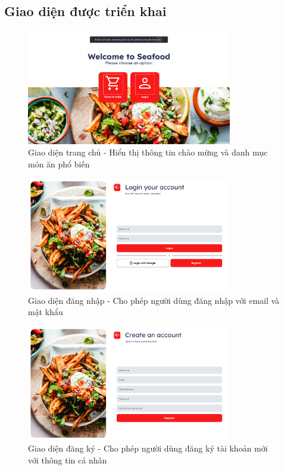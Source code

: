 \documentclass[a4paper]{article}
\begin{document}
\subsection{Giao diện được triển khai}
    \begin{figure}[H]
        \centering
        \includegraphics[width=0.8\textwidth]{home.png}
        \caption{Giao diện trang chủ - Hiển thị thông tin chào mừng và danh mục món ăn phổ biến}
    \end{figure}
    
    \begin{figure}[H]
        \centering
        \includegraphics[width=0.8\textwidth]{login.png}
        \caption{Giao diện đăng nhập - Cho phép người dùng đăng nhập với email và mật khẩu}
    \end{figure}
    
    \begin{figure}[H]
        \centering
        \includegraphics[width=0.8\textwidth]{register.png}
        \caption{Giao diện đăng ký - Cho phép người dùng đăng ký tài khoản mới với thông tin cá nhân}
    \end{figure}
    
\end{document}
